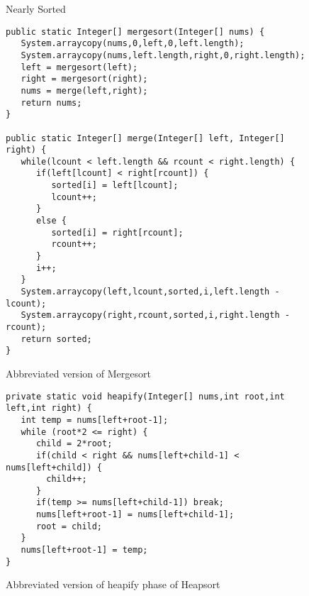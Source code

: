 \documentclass{article}
\begin{document}
\begin{figure}
\centering
{}
\caption{Nearly Sorted}
\label{graph-nearly}
\end{figure}

\begin{figure}
\begin{lstlisting}
public static Integer[] mergesort(Integer[] nums) { 
   System.arraycopy(nums,0,left,0,left.length);
   System.arraycopy(nums,left.length,right,0,right.length);
   left = mergesort(left);
   right = mergesort(right);
   nums = merge(left,right);
   return nums;
}

public static Integer[] merge(Integer[] left, Integer[] right) {
   while(lcount < left.length && rcount < right.length) {
      if(left[lcount] < right[rcount]) {
         sorted[i] = left[lcount];
         lcount++;
      }
      else {
         sorted[i] = right[rcount];
         rcount++;
      }
      i++;
   }
   System.arraycopy(left,lcount,sorted,i,left.length - lcount);
   System.arraycopy(right,rcount,sorted,i,right.length - rcount);
   return sorted;
}
\end{lstlisting}
\caption{Abbreviated version of Mergesort}
\label{code-mergesort}
\end{figure}

\begin{figure}
\begin{lstlisting}
private static void heapify(Integer[] nums,int root,int left,int right) {
   int temp = nums[left+root-1];
   while (root*2 <= right) {
      child = 2*root;
      if(child < right && nums[left+child-1] < nums[left+child]) {
        child++;
      }
      if(temp >= nums[left+child-1]) break;
      nums[left+root-1] = nums[left+child-1];
      root = child;
   }
   nums[left+root-1] = temp;
}
\end{lstlisting}
\caption{Abbreviated version of heapify phase of Heapsort}
\label{code-heapsort}
\end{figure}
\end{document}
